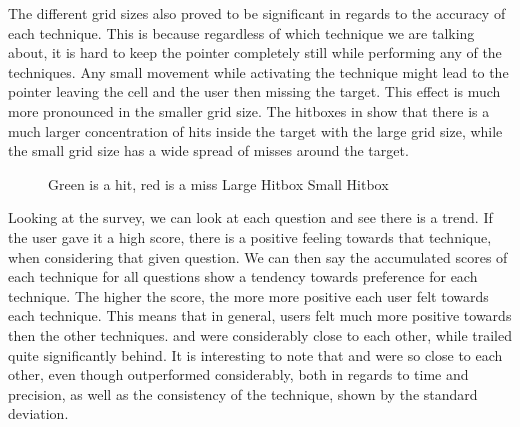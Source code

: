 The different grid sizes also proved to be significant in regards to the accuracy of each technique. This is because regardless of which technique we are talking about, it is hard to keep the pointer completely still while performing any of the techniques. Any small movement while activating the technique might lead to the pointer leaving the cell and the user then missing the target. This effect is much more pronounced in the smaller grid size. The hitboxes in  show that there is a much larger concentration of hits inside the target with the large grid size, while the small grid size has a wide spread of misses around the target.

\begin{figure}[H] 
	\centering
	\caption{
		Green is a hit, red is a miss
		\protect{} Large Hitbox
		\protect{} Small Hitbox
	}
	\label{fig:shitboxes}
\end{figure}


Looking at the survey, we can look at each question and see there is a trend.
If the user gave it a high score, there is a positive feeling towards that technique, when considering that given question.
We can then say the accumulated scores of each technique for all questions show a tendency towards preference for each technique.
The higher the score, the more more positive each user felt towards each technique.
This means that in general, users felt much more positive towards \swipe then the other techniques. 
\throw and \tilt were considerably close to each other, while \pinch trailed quite significantly behind.
It is interesting to note that \throw and \tilt were so close to each other, even though \throw outperformed \tilt considerably, both in regards to time and precision, as well as the consistency of the technique, shown by the standard deviation. 

